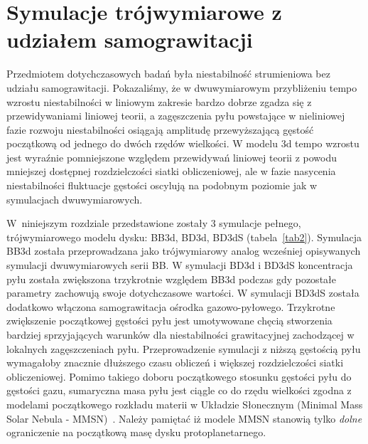 \section{Symulacje trójwymiarowe z udziałem samograwitacji}
\label{sec:sim_3d}
Przedmiotem dotychczasowych badań była niestabilność strumieniowa bez udziału
samograwitacji. Pokazaliśmy, że w dwuwymiarowym przybliżeniu tempo wzrostu
niestabilności w liniowym zakresie bardzo dobrze zgadza się z przewidywaniami
liniowej teorii, a zagęszczenia pyłu powstające w nieliniowej fazie rozwoju
niestabilności osiągają amplitudę przewyższającą gęstość początkową od jednego
do dwóch rzędów wielkości. W modelu 3d tempo wzrostu jest wyraźnie pomniejszone
względem przewidywań liniowej teorii z powodu mniejszej dostępnej rozdzielczości
siatki obliczeniowej, ale w fazie nasycenia niestabilności fluktuacje
gęstości oscylują na podobnym poziomie jak w symulacjach dwuwymiarowych. 
%
\par W~niniejszym rozdziale przedstawione zostały 3 symulacje pełnego,
trójwymiarowego modelu dysku: BB3d, BD3d, BD3dS (tabela~\ref{tab2}).  Symulacja
BB3d została przeprowadzana jako trójwymiarowy analog wcześniej opisywanych
symulacji dwuwymiarowych serii BB. W symulacji BD3d i BD3dS koncentracja pyłu
została zwiększona trzykrotnie względem BB3d podczas gdy pozostałe parametry
zachowują swoje dotychczasowe wartości. W symulacji BD3dS została dodatkowo
włączona samograwitacja ośrodka gazowo-pyłowego. Trzykrotne zwiększenie
początkowej gęstości pyłu jest umotywowane chęcią stworzenia bardziej
sprzyjających warunków dla niestabilności grawitacyjnej zachodzącej w lokalnych
zagęszczeniach pyłu. Przeprowadzenie symulacji z niższą gęstością pyłu
wymagałoby znacznie dłuższego czasu obliczeń i większej rozdzielczości siatki
obliczeniowej. Pomimo takiego doboru początkowego stosunku gęstości pyłu do
gęstości gazu, sumaryczna masa pyłu jest ciągle co do rzędu wielkości zgodna z
modelami początkowego rozkładu materii w Układzie Słonecznym (Minimal Mass Solar
Nebula - MMSN)~\cite{D07}. Należy
pamiętać iż modele MMSN stanowią tylko \emph{dolne} ograniczenie na początkową
masę dysku protoplanetarnego.

